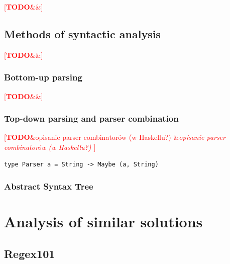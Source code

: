 \documentclass[english,engineering]{wizthesis}
\newcommand{\todo}[1]{%
  \textcolor{red}{[\textbf{TODO}\ifx&#1&{}\else{ }\fi\emph{#1}]}%
}
\begin{document}
\todo{}

\section{Methods of syntactic analysis} \label{sec:parsing}

\todo{\cite{aho-2019}}

\subsection{Bottom-up parsing}

\todo{}

\subsection{Top-down parsing and parser combination}

\todo{opisanie parser combinatorów (w Haskellu?) \cite{swierstra-2009}
\cite{leijen-2001} \cite{fokker-1995}}

\begin{verbatim}
type Parser a = String -> Maybe (a, String)
\end{verbatim}




\subsection{Abstract Syntax Tree}
\label{sbs:ast}

\chapter{Analysis of similar solutions}

\section*{Regex101}
\end{document}
